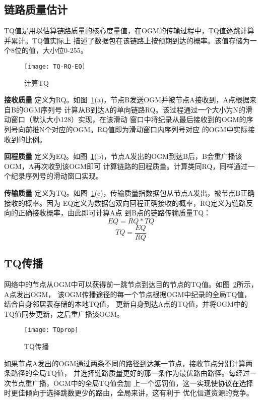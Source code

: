 \subsection{链路质量估计}
\label{sec:3.2.3}
TQ值是用以估算链路质量的核心度量值，在OGM的传输过程中，TQ值逐跳计算并累计。TQ值实际上
描述了数据包在该链路上按预期到达的概率。该值存储为一个8位的值，大小位0-255。

\begin{figure}[H] %
  \centering
  \texttt{[image: TQ-RQ-EQ]}
  \caption{计算TQ}
  \label{fig:TQ-RQ-EQ}
\end{figure}

\textbf{接收质量} 定义为RQ。如图~\ref{fig:TQ-RQ-EQ}(a)，节点B发送OGM并被节点A接收到，A点根据来自B的OGM序列号
计算从B到达A的单向链路RQ。该过程通过一个大小为N的滑动窗口（默认大小128）实现，在该滑动
窗口中将纪录从最后接收到的OGM的序列号向前推N个对应的OGM。RQ值即为滑动窗口内序列号对应
的OGM中实际接收到的比例。

\textbf{回程质量} 定义为EQ。如图~\ref{fig:TQ-RQ-EQ}(b)，节点A发出的OGM到达B后，B会重广播该OGM，A再次收到该OGM即可
计算链路的回程质量。计算类同RQ，同样通过一个纪录序列号的滑动窗口实现。

\textbf{传输质量} 定义为TQ。如图~\ref{fig:TQ-RQ-EQ}(c)，传输质量指数据包从节点A发出，被节点B正确接收的概率。因为
EQ定义为数据包双向回程正确接收的概率，RQ定义为链路反向的正确接收概率，由此即可计算A点
到B点的链路传输质量TQ：
\begin{equation}
EQ=RQ*TQ
\end{equation}
\begin{equation}
TQ=\frac{EQ}{RQ}
\end{equation}


\subsection{TQ传播}
网络中的节点从OGM中可以获得前一跳节点到达目的节点的TQ值。如图~\ref{fig:TQprop}所示，A点发出OGM，
该OGM传播途径的每一个节点根据OGM中纪录的全局TQ值，结合自身邻居表存储的本地TQ值，
更新自身到达A点的TQ值，并将OGM中的TQ值同步更新，之后重广播该OGM。

\begin{figure}[H] %
  \centering
  \texttt{[image: TQprop]}
  \caption{TQ传播}
  \label{fig:TQprop}
\end{figure}

如果节点A发出的OGM通过两条不同的路径到达某一节点，接收节点分别计算两条路径的全局TQ值，
并选择链路质量更好的那一条作为最优路由路径。每经过一次节点重广播，OGM中的全局TQ值会加
上一个惩罚值，这一实现使协议在选择时更佳倾向于选择跳数更少的路由，全局来讲，这有利于
优化信道资源的竞争。

